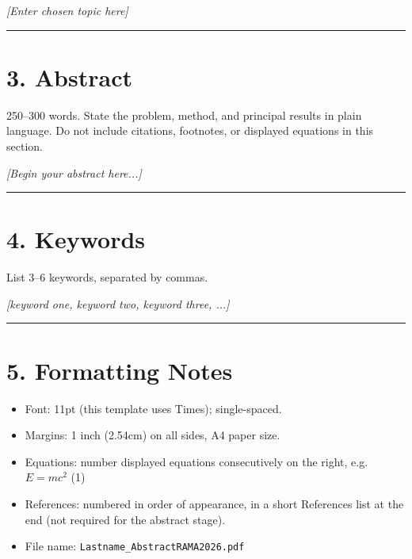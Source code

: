 \documentclass[11pt,a4paper]{article}
\newcommand{\placeholder}[1]{\textit{\color{gray}#1}}
\begin{document}
\vspace{0.2cm}
\noindent\placeholder{[Enter chosen topic here]}

\vspace{0.3cm}
\noindent\rule{\linewidth}{0.4pt}

\section*{3. \; Abstract}

\noindent\small\color{ramasoft}
250--300 words. State the problem, method, and principal results in
plain language. Do not include citations, footnotes, or displayed
equations in this section.
\normalcolor\normalsize

\vspace{0.2cm}
\noindent\placeholder{[Begin your abstract here...]}

\vspace{3.2cm}

\noindent\rule{\linewidth}{0.4pt}

\section*{4. \; Keywords}

\noindent\small\color{ramasoft}List 3--6 keywords, separated by commas.\normalcolor\normalsize

\vspace{0.2cm}
\noindent\placeholder{[keyword one, keyword two, keyword three, ...]}

\vspace{0.3cm}
\noindent\rule{\linewidth}{0.4pt}

\section*{5. \; Formatting Notes}

\begin{itemize}\setlength\itemsep{2pt}
  \item Font: 11pt (this template uses Times); single-spaced.
  \item Margins: 1 inch (2.54cm) on all sides, A4 paper size.
  \item Equations: number displayed equations consecutively on the
        right, e.g.\ \(E = mc^2\) \hfill (1)
  \item References: numbered in order of appearance, in a short
        References list at the end (not required for the abstract
        stage).
  \item File name: \texttt{Lastname\_AbstractRAMA2026.pdf}
\end{itemize}
\end{document}
